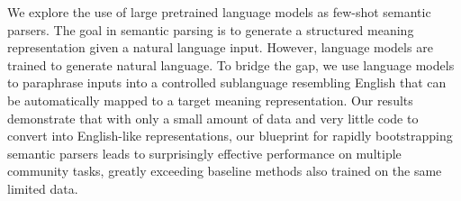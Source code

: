 We explore the use of large pretrained language models as few-shot semantic parsers. The goal in semantic parsing is to generate a structured meaning representation given a natural language input. However, language models are trained to generate natural language. To bridge the gap, we use language models to paraphrase inputs into a controlled sublanguage resembling English that can be automatically mapped to a target meaning representation. Our results demonstrate that with only a small amount of data and very little code to convert into English-like representations, our blueprint for rapidly bootstrapping semantic parsers leads to surprisingly effective performance on multiple community tasks, greatly exceeding baseline methods also trained on the same limited data.

